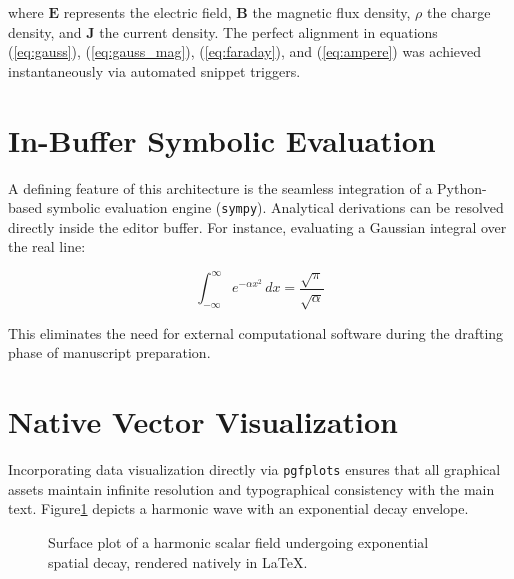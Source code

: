 \documentclass[twocolumn, 10pt]{article}
\begin{document}
where $\mathbf{E}$ represents the electric field, $\mathbf{B}$ the magnetic flux density, $\rho$ the charge density, and $\mathbf{J}$ the current density. The perfect alignment in equations (\ref{eq:gauss}), (\ref{eq:gauss_mag}), (\ref{eq:faraday}), and (\ref{eq:ampere}) was achieved instantaneously via automated snippet triggers.

\section{In-Buffer Symbolic Evaluation}

A defining feature of this architecture is the seamless integration of a Python-based symbolic evaluation engine (\texttt{sympy}). Analytical derivations can be resolved directly inside the editor buffer. For instance, evaluating a Gaussian integral over the real line:

\begin{equation}
    \int_{-\infty}^{\infty} e^{- \alpha x^{2}}\, dx = \frac{\sqrt{\pi}}{\sqrt{\alpha}}
\end{equation}

This eliminates the need for external computational software during the drafting phase of manuscript preparation.

\section{Native Vector Visualization}

Incorporating data visualization directly via \texttt{pgfplots} ensures that all graphical assets maintain infinite resolution and typographical consistency with the main text. Figure\ref{fig:wave} depicts a harmonic wave with an exponential decay envelope.

\begin{figure}[H]
    \centering
    \caption{Surface plot of a harmonic scalar field undergoing exponential spatial decay, rendered natively in \LaTeX{}.}\label{fig:wave}
\end{figure}
\end{document}
